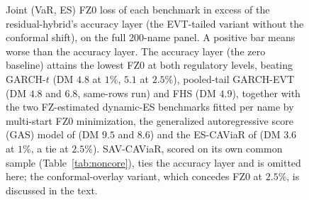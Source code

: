\documentclass[11pt]{article}
\theoremstyle{remark}
\begin{document}
\begin{figure}[t]
\centering
{}
\caption{Joint (VaR, ES) FZ0 loss of each benchmark in excess of the
residual-hybrid's accuracy layer (the EVT-tailed variant without the
conformal shift), on the full 200-name panel. A positive bar
means worse than the accuracy layer. The accuracy layer (the zero baseline) attains the
lowest FZ0 at both regulatory levels, beating GARCH-$t$ (DM $4.8$ at
$1\%$, $5.1$ at $2.5\%$), pooled-tail GARCH-EVT (DM $4.8$ and $6.8$, same-rows run) and FHS (DM $4.9$), together with the two
FZ-estimated dynamic-ES benchmarks fitted per name by multi-start FZ0
minimization, the generalized autoregressive score (GAS) model of \citet{patton2019} (DM $9.5$ and $8.6$) and the
ES-CAViaR of \citet{taylor2019} (DM $3.6$ at $1\%$, a tie at $2.5\%$). SAV-CAViaR, scored on its own common sample (Table~\ref{tab:noncore}), ties the accuracy layer and is omitted here; the conformal-overlay variant, which concedes FZ0 at $2.5\%$, is discussed in the text.}
\label{fig:fz0}
\end{figure}
\end{document}
